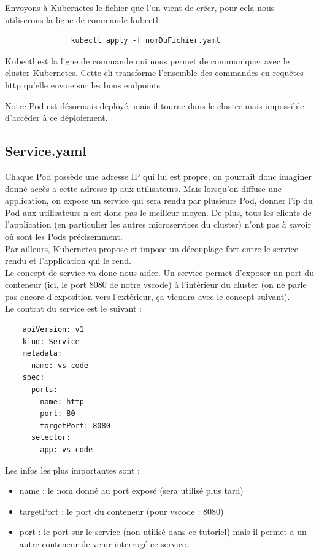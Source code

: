 \documentclass[11pt,fleqn]{book} %
\begin{document}
Envoyons à Kubernetes le fichier que l'on vient de créer, pour cela nous utiliserons la ligne de commande kubectl:
\begin{verbatim}
               kubectl apply -f nomDuFichier.yaml
\end{verbatim}
Kubectl est la ligne de commande qui nous permet de communiquer avec le cluster Kubernetes. Cette cli transforme l'ensemble des commandes en requêtes http qu'elle envoie sur les bons endpoints\newline

Notre Pod est désormais deployé, mais il tourne dans le cluster mais impossible d'accéder à ce déploiement. 
\subsection*{Service.yaml}
Chaque Pod possède une adresse IP qui lui est propre, on pourrait donc imaginer donné accès a cette adresse ip aux utilisateurs. Mais lorsqu'on diffuse une application, on expose un service qui sera rendu par plusieurs Pod, donner l'ip du Pod aux utilisateurs n'est donc pas le meilleur moyen. De plus, tous les clients de l'application (en particulier les autres microservices du cluster) n'ont pas à savoir où sont les Pods précisemment. \\

Par ailleurs, Kubernetes propose et impose un découplage fort entre le service rendu et l'application qui le rend. \\ 

Le concept de service va donc nous aider. Un service permet d'exposer un port du conteneur (ici, le port 8080 de notre vscode) à l'intérieur du cluster (on ne parle pas encore d'exposition vers l'extérieur, ça viendra avec le concept suivant). \\
Le contrat du service est le suivant : 
\begin{verbatim}
    apiVersion: v1
    kind: Service
    metadata:
      name: vs-code
    spec:
      ports:
      - name: http
        port: 80
        targetPort: 8080
      selector:
        app: vs-code
\end{verbatim}
Les infos les plus importantes sont : 
\begin{itemize}
    \item name : le nom donné au port exposé (sera utilisé plus tard)
    \item targetPort : le port du conteneur (pour vscode : 8080)
    \item port : le port sur le service (non utilisé dans ce tutoriel) mais il permet a un autre conteneur de venir interrogé ce service.\\
\end{itemize}
\end{document}
